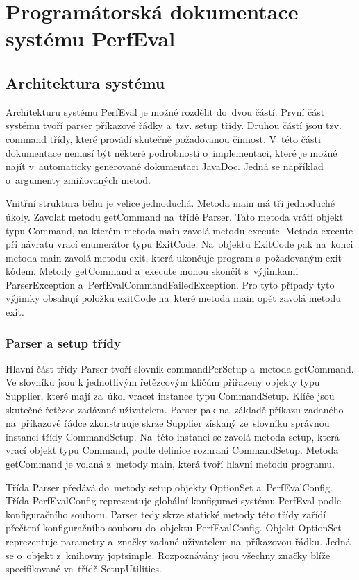 \chapter{Programátorská dokumentace systému PerfEval}

\section{Architektura systému}

Architekturu systému PerfEval je možné rozdělit do~dvou částí. První část systému tvoří
parser příkazové řádky a~tzv. setup třídy. Druhou částí jsou tzv. command třídy,
které provádí skutečně požadovanou činnost. V~této části dokumentace nemusí být
některé podrobnosti o~implementaci, které je možné najít v~automaticky generované dokumentaci
JavaDoc. Jedná se například o~argumenty zmiňovaných metod.

Vnitřní struktura běhu je velice jednoduchá. Metoda main má tři jednoduché úkoly.
Zavolat metodu getCommand na~třídě Parser. Tato metoda vrátí objekt typu Command,
na kterém metoda main zavolá metodu execute. Metoda execute při návratu vrací enumerátor
typu ExitCode. Na~objektu ExitCode pak na~konci metoda main zavolá metodu exit,
která ukončuje program s~požadovaným exit kódem. Metody getCommand a~execute mohou skončit
s~výjimkami ParserException a~PerfEvalCommandFailedException. Pro tyto případy tyto
výjimky obsahují položku exitCode na~které metoda main opět zavolá metodu exit.

\subsection{Parser a setup třídy}

Hlavní část třídy Parser tvoří slovník commandPerSetup a~metoda getCommand.
Ve slovníku jsou k jednotlivým řetězcovým klíčům přiřazeny objekty typu
Supplier, které mají za~úkol vracet instance typu CommandSetup.
Klíče jsou skutečné řetězce zadávané uživatelem. Parser pak na~základě příkazu
zadaného na~příkazové řádce zkonstruuje skrze Supplier získaný ze~slovníku správnou
instanci třídy CommandSetup. Na~této instanci se zavolá metoda setup, která vrací
objekt typu Command, podle definice rozhraní CommandSetup. Metoda getCommand je volaná
z~metody main, která tvoří hlavní metodu programu.

Třída Parser předává do~metody setup objekty OptionSet a~PerfEvalConfig. Třída PerfEvalConfig
reprezentuje globální konfiguraci systému PerfEval podle konfiguračního souboru.
Parser tedy skrze statické metody této třídy zařídí přečtení konfiguračního souboru
do~objektu PerfEvalConfig. Objekt OptionSet reprezentuje parametry a~značky zadané
uživatelem na~příkazovou řádku. Jedná se o~objekt z~knihovny joptsimple. Rozpoznávány jsou
všechny značky blíže specifikované ve~třídě SetupUtilities.

